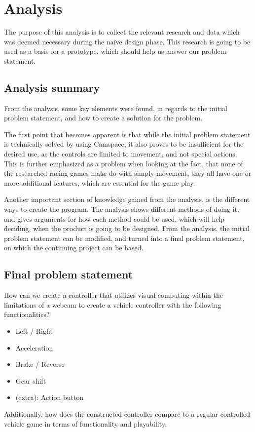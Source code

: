 \section{Analysis} \label{sec:analysis}
The purpose of this analysis is to collect the relevant research and data which was deemed necessary during the naïve design phase. This research is going to be used as a basis for a prototype, which should help us answer our problem statement. 











\subsection{Analysis summary}
From the analysis, some key elements were found, in regards to the initial problem statement, and how to create a solution for the problem.

The first point that becomes apparent is that while the initial problem statement is technically solved by using Camspace, it also proves to be insufficient for the desired use, as the controls are limited to movement, and not special actions. This is further emphasized as a problem when looking at the fact, that none of the researched racing games make do with simply movement, they all have one or more additional features, which are essential for the game play.

Another important section of knowledge gained from the analysis, is the different ways to create the program. The analysis shows different methods of doing it, and gives arguments for how each method could be used, which will help deciding, when the product is going to be designed.
From the analysis, the initial problem statement can be modified, and turned into a final problem statement, on which the continuing project can be based.


\subsection{Final problem statement}
How can we create a controller that utilizes visual computing within the limitations of a webcam to create a vehicle controller with the following functionalities?
\begin{itemize}
\item Left / Right
\item Acceleration
\item Brake / Reverse
\item Gear shift
\item (extra): Action button
\end{itemize}
Additionally, how does the constructed controller compare to a regular controlled vehicle game in terms of functionality and playability.